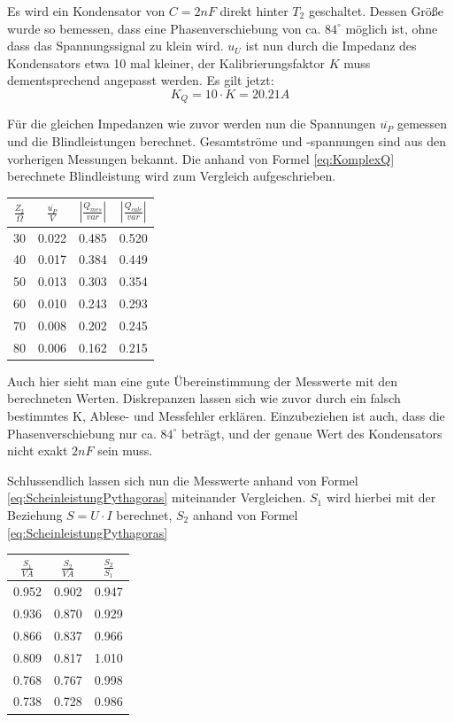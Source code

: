 Es wird ein Kondensator von $C=2nF$ direkt hinter $T_2$ geschaltet. Dessen Größe wurde so bemessen, dass eine Phasenverschiebung von ca. $84^\circ$ möglich ist, ohne dass das Spannungssignal zu klein wird. $u_U$ ist nun durch die Impedanz des Kondensators etwa 10 mal kleiner, der Kalibrierungsfaktor $K$ muss dementsprechend angepasst werden. Es gilt jetzt:
\begin{equation*}
K_{Q} = 10\cdot K = 20.21A
\end{equation*}

Für die gleichen Impedanzen wie zuvor werden nun die Spannungen $\overline{u_P}$ gemessen und die Blindleistungen berechnet. Gesamtströme und -spannungen sind aus den vorherigen Messungen bekannt. Die anhand von Formel \eqref{eq:KomplexQ} berechnete Blindleistung wird zum Vergleich aufgeschrieben.

\begin{large}
\begin{center}
\begin{tabular}{| c | c | c | c |}
\hline
$\frac{Z_2}{\Omega}$ & $\frac{\overline{u_P}}{V}$ & 
$\left|\frac{Q_{mes}}{var}\right|$ & $\left|\frac{Q_{calc}}{var}\right|$ \\
\hline
30 & 0.022 & 0.485 & 0.520 \\
40 & 0.017 & 0.384 & 0.449 \\
50 & 0.013 & 0.303 & 0.354 \\
60 & 0.010 & 0.243 & 0.293 \\
70 & 0.008 & 0.202 & 0.245 \\
80 & 0.006 & 0.162 & 0.215 \\
\hline
\end{tabular}
\end{center}
\end{large}

Auch hier sieht man eine gute Übereinstimmung der Messwerte mit den berechneten Werten. Diskrepanzen lassen sich wie zuvor durch ein falsch bestimmtes K, Ablese- und Messfehler erklären. Einzubeziehen ist auch, dass die Phasenverschiebung nur ca. $84^\circ$ beträgt, und der genaue Wert des Kondensators nicht exakt $2nF$ sein muss.

Schlussendlich lassen sich nun die Messwerte anhand von Formel \eqref{eq:ScheinleistungPythagoras} miteinander Vergleichen. $S_1$ wird hierbei mit der Beziehung $S=U\cdot I$ berechnet, $S_2$ anhand von Formel \eqref{eq:ScheinleistungPythagoras}

\begin{large}
\begin{center}
\begin{tabular}{| c | c | c |}
\hline
$\frac{S_1}{VA}$ & $\frac{S_2}{VA}$ & $\frac{S_2}{S_1}$ \\
\hline
0.952 & 0.902 & 0.947 \\
0.936 & 0.870 & 0.929 \\
0.866 & 0.837 & 0.966 \\
0.809 & 0.817 & 1.010 \\
0.768 & 0.767 & 0.998 \\
0.738 & 0.728 & 0.986 \\
\hline
\end{tabular}
\end{center}
\end{large}